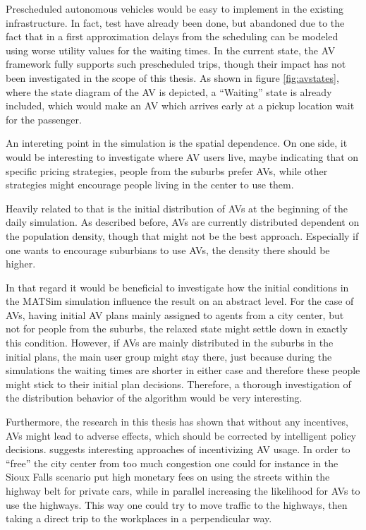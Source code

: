 Prescheduled autonomous vehicles would be easy to implement in the existing infrastructure.
In fact, test have already been done, but abandoned due to the fact that in a first
approximation delays from the scheduling can be modeled using worse utility values
for the waiting times.
In the current state, the AV framework fully supports such prescheduled trips, though
their impact has not been investigated in the scope of this thesis. As shown in
figure \cref{fig:avstates}, where the state diagram of the AV is depicted, a ``Waiting''
state is already included, which would make an AV which arrives early at a pickup
location wait for the passenger.

An intereting point in the simulation is the spatial dependence. On one side,
it would be interesting to investigate where AV users live, maybe indicating that
on specific pricing strategies, people from the suburbs prefer AVs, while other
strategies might encourage people living in the center to use them.

Heavily related to that is the initial distribution of AVs at the beginning
of the daily simulation. As described before, AVs are currently distributed dependent on
the population density, though that might not be the best approach. Especially
if one wants to encourage suburbians to use AVs, the density there should be higher.

In that regard it would be beneficial to investigate how the initial conditions
in the MATSim simulation influence the result on an abstract level. For the case of
AVs, having initial AV plans mainly assigned to agents from a city center, but not for people
from the suburbs, the relaxed state might settle down in exactly this condition.
However, if AVs are mainly distributed in the suburbs in the initial plans, the
main user group might stay there, just because during the simulations the waiting
times are shorter in either case and therefore these people might stick to their
initial plan decisions. Therefore, a thorough investigation of the distribution
behavior of the algorithm would be very interesting.

Furthermore, the research in this thesis has shown that without any incentives, AVs might lead
to adverse effects, which should be corrected by intelligent policy decisions.  suggests
interesting approaches of incentivizing AV usage. In order to ``free'' the city center
from too much congestion one could for instance in the Sioux Falls scenario put high monetary fees on using the streets within the
highway belt for private cars, while in parallel increasing the likelihood for AVs
to use the highways. This way one could try to move traffic to the highways, then
taking a direct trip to the workplaces in a perpendicular way.

